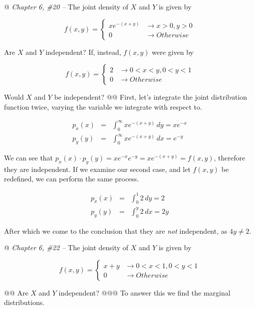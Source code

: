 \documentclass[11pt]{article}\usepackage[]{graphicx}\usepackage[]{xcolor}
\begin{document}
\begin{easylist}[enumerate]
    @ \textit{Chapter 6, \#20 --} The joint density of $X$ and $Y$ is given by

    \[
        f(x, y) =
        \begin{cases}
            xe^{-(x + y)} &\to x > 0, y > 0\\
            0 &\to Otherwise
        \end{cases}
    \]

    Are $X$ and $Y$ independent? If, instead, $f(x,y)$ were given by

    \[
        f(x, y) =
        \begin{cases}
            2 &\to 0 < x < y, 0 < y < 1\\
            0 &\to Otherwise
        \end{cases}
    \]

    Would $X$ and $Y$ be independent?
    @@ First, let's integrate the joint distribution function twice, varying the variable we integrate with respect to.

    \[
        \begin{aligned}
            p_x(x) &=& \int_0^\infty xe^{-(x + y)} \, dy = xe^{-x}\\
            p_y(y) &=& \int_0^\infty xe^{-(x + y)} \, dx = e^{-y}
        \end{aligned}
    \]

    We can see that $p_x(x) \cdot p_y(y) = xe^{-x} e^{-y} = xe^{-(x + y)} = f(x, y)$, therefore they are independent. If
    we examine our second case, and let $f(x,y)$ be redefined, we can perform the same process.

    \[
        \begin{aligned}
            p_x(x) &=& \int_0^1 2 \, dy = 2\\
            p_y(y) &=& \int_0^y 2 \, dx = 2y
        \end{aligned}
    \]

    After which we come to the conclusion that they are \textit{not} independent, as $4y \neq 2$.

    @ \textit{Chapter 6, \#22 --}  The joint density of $X$ and $Y$ is given by

    \[
        f(x, y) =
        \begin{cases}
            x + y &\to 0 < x < 1, 0 < y < 1\\
            0 &\to Otherwise
        \end{cases}
    \]

    @@ Are $X$ and $Y$ independent?
    @@@ To answer this we find the marginal distributions.


\end{easylist}
\end{document}
